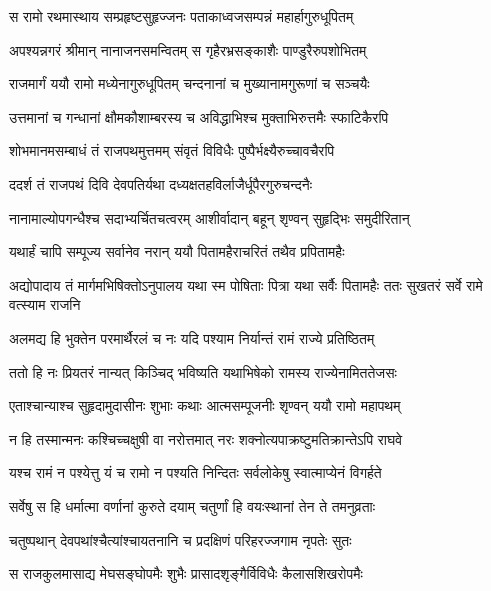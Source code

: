 
\twolineshloka
{स रामो रथमास्थाय सम्प्रहृष्टसुहृज्जनः}
{पताकाध्वजसम्पन्नं महार्हागुरुधूपितम्} %

\twolineshloka
{अपश्यन्नगरं श्रीमान् नानाजनसमन्वितम्}
{स गृहैरभ्रसङ्काशैः पाण्डुरैरुपशोभितम्} %

\twolineshloka
{राजमार्गं ययौ रामो मध्येनागुरुधूपितम्}
{चन्दनानां च मुख्यानामगुरूणां च सञ्चयैः} %

\twolineshloka
{उत्तमानां च गन्धानां क्षौमकौशाम्बरस्य च}
{अविद्धाभिश्च मुक्ताभिरुत्तमैः स्फाटिकैरपि} %

\twolineshloka
{शोभमानमसम्बाधं तं राजपथमुत्तमम्}
{संवृतं विविधैः पुष्पैर्भक्ष्यैरुच्चावचैरपि} %

\twolineshloka
{ददर्श तं राजपथं दिवि देवपतिर्यथा}
{दध्यक्षतहविर्लाजैर्धूपैरगुरुचन्दनैः} %

\twolineshloka
{नानामाल्योपगन्धैश्च सदाभ्यर्चितचत्वरम्}
{आशीर्वादान् बहून् शृण्वन् सुहृद्भिः समुदीरितान्} %

\twolineshloka
{यथार्हं चापि सम्पूज्य सर्वानेव नरान् ययौ}
{पितामहैराचरितं तथैव प्रपितामहैः} %

\threelineshloka
{अद्योपादाय तं मार्गमभिषिक्तोऽनुपालय}
{यथा स्म पोषिताः पित्रा यथा सर्वैः पितामहैः}
{ततः सुखतरं सर्वे रामे वत्स्याम राजनि} %

\twolineshloka
{अलमद्य हि भुक्तेन परमार्थैरलं च नः}
{यदि पश्याम निर्यान्तं रामं राज्ये प्रतिष्ठितम्} %

\twolineshloka
{ततो हि नः प्रियतरं नान्यत् किञ्चिद् भविष्यति}
{यथाभिषेको रामस्य राज्येनामिततेजसः} %

\twolineshloka
{एताश्चान्याश्च सुहृदामुदासीनः शुभाः कथाः}
{आत्मसम्पूजनीः शृण्वन् ययौ रामो महापथम्} %

\twolineshloka
{न हि तस्मान्मनः कश्चिच्चक्षुषी वा नरोत्तमात्}
{नरः शक्नोत्यपाक्रष्टुमतिक्रान्तेऽपि राघवे} %

\twolineshloka
{यश्च रामं न पश्येत्तु यं च रामो न पश्यति}
{निन्दितः सर्वलोकेषु स्वात्माप्येनं विगर्हते} %

\twolineshloka
{सर्वेषु स हि धर्मात्मा वर्णानां कुरुते दयाम्}
{चतुर्णां हि वयःस्थानां तेन ते तमनुव्रताः} %

\twolineshloka
{चतुष्पथान् देवपथांश्चैत्यांश्चायतनानि च}
{प्रदक्षिणं परिहरज्जगाम नृपतेः सुतः} %

\twolineshloka
{स राजकुलमासाद्य मेघसङ्घोपमैः शुभैः}
{प्रासादशृङ्गैर्विविधैः कैलासशिखरोपमैः} %

